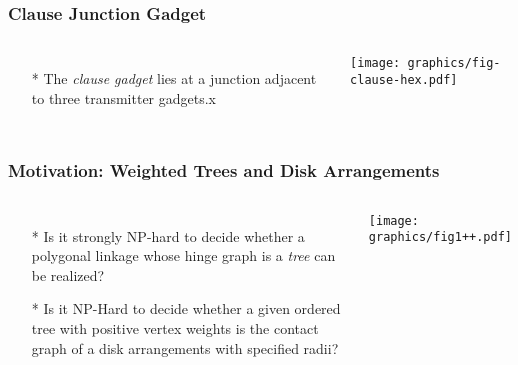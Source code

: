 \documentclass{beamer}
\begin{document}
\begin{frame} \frametitle{Clause Junction Gadget}
    \begin{columns}[c]
        \begin{itemize}
            \item[*] The {\it clause gadget} lies at a junction adjacent to three transmitter gadgets.x
        \end{itemize}
        \begin{minipage}{\linewidth}
            \begin{center}
            \texttt{[image: graphics/fig-clause-hex.pdf]}\label{gfx:fig-clause-hex.pdf}
            \end{center}
        \end{minipage}
    \end{columns}
\end{frame}

\begin{frame}\frametitle{Motivation: Weighted Trees and Disk Arrangements}
    \begin{columns}[c]
        \begin{itemize}
            \item[*] Is it strongly NP-hard to decide whether a polygonal linkage whose hinge graph is a \textit{tree} can be realized? 
            \item[*] Is it NP-Hard to decide whether a given ordered tree with positive vertex weights is the contact graph of a disk arrangements with specified radii?
        \end{itemize}
        \begin{minipage}{\linewidth}
            \begin{center}
            \texttt{[image: graphics/fig1++.pdf]}
            \end{center}
        \end{minipage}
    \end{columns}
\end{frame}
\end{document}
